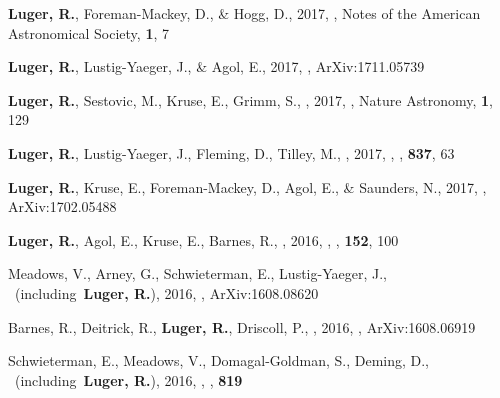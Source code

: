 \item[{\color{numcolor}\scriptsize}] \textbf{Luger, R.}, Foreman-Mackey, D., \& Hogg, D., 2017, , Notes of the American Astronomical Society, \textbf{1}, 7

\item[{\color{numcolor}\scriptsize1}] \textbf{Luger, R.}, Lustig-Yaeger, J., \& Agol, E., 2017, , ArXiv:1711.05739

\item[{\color{numcolor}\scriptsize18}] \textbf{Luger, R.}, Sestovic, M., Kruse, E., Grimm, S., \etal, 2017, , Nature Astronomy, \textbf{1}, 129

\item[{\color{numcolor}\scriptsize6}] \textbf{Luger, R.}, Lustig-Yaeger, J., Fleming, D., Tilley, M., \etal, 2017, , \apj, \textbf{837}, 63

\item[{\color{numcolor}\scriptsize8}] \textbf{Luger, R.}, Kruse, E., Foreman-Mackey, D., Agol, E., \& Saunders, N., 2017, , ArXiv:1702.05488

\item[{\color{numcolor}\scriptsize37}] \textbf{Luger, R.}, Agol, E., Kruse, E., Barnes, R., \etal, 2016, , \aj, \textbf{152}, 100

\item[{\color{numcolor}\scriptsize23}] Meadows, V., Arney, G., Schwieterman, E., Lustig-Yaeger, J., \etal\ (including\ \textbf{Luger, R.}), 2016, , ArXiv:1608.08620

\item[{\color{numcolor}\scriptsize23}] Barnes, R., Deitrick, R., \textbf{Luger, R.}, Driscoll, P., \etal, 2016, , ArXiv:1608.06919

\item[{\color{numcolor}\scriptsize22}] Schwieterman, E., Meadows, V., Domagal-Goldman, S., Deming, D., \etal\ (including\ \textbf{Luger, R.}), 2016, , \apj, \textbf{819}

